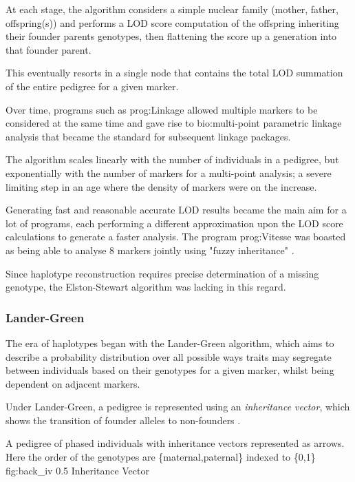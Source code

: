 At each stage, the algorithm considers a simple nuclear family (mother, father, offspring(s)) and performs a LOD score computation of the offspring inheriting their founder parents genotypes, then flattening the score up a generation into that founder parent.

This eventually resorts in a single node that contains the total LOD summation of the entire pedigree for a given marker.

Over time, programs such as \gls{prog:Linkage} allowed multiple markers to be considered at the same time and gave rise to \gls{bio:multi-point parametric} linkage analysis that became the standard for subsequent linkage packages.

The algorithm scales linearly with the number of individuals in a pedigree, but exponentially with the number of markers for a multi-point analysis; a severe limiting step in an age where the density of markers were on the increase.

Generating fast and reasonable accurate LOD results became the main aim for a lot of programs, each performing a different approximation upon the LOD score calculations to generate a faster analysis. The program \gls{prog:Vitesse} was boasted as being able to analyse 8 markers jointly using "fuzzy inheritance" \cite{o1995vitesse}.

Since haplotype reconstruction requires precise determination of a missing genotype, the Elston-Stewart algorithm was lacking in this regard.

\subsubsection{Lander-Green}

The era of haplotypes began with the Lander-Green algorithm, which aims to describe a probability distribution over all possible ways traits may segregate between individuals based on their genotypes for a given marker, whilst being dependent on adjacent markers.

Under Lander-Green, a pedigree is represented using an \textit{inheritance vector}, which shows the transition of founder alleles to non-founders \cite{landergreen}.

	{A pedigree of phased individuals with inheritance vectors represented as arrows. Here the order of the genotypes are \{maternal,paternal\} indexed to \{0,1\}}
	{fig:back_iv}
	{0.5}
	{Inheritance Vector}



